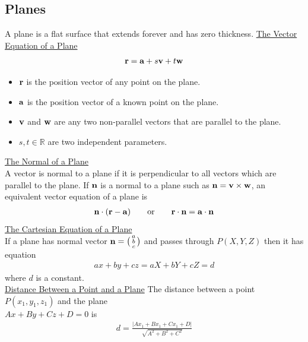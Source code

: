 \documentclass[10pt, a4paper, titlepage]{article}
\begin{document}
\begin{multicols*}{3}
	\dotfill
	\subsection{Planes}
	A plane is a flat surface that extends forever and has zero thickness.
	\underline{The Vector Equation of a Plane}
	\begin{align}
		\vb{r}=\vb{a}+s\vb{v}+t\vb{w}
	\end{align}
	\begin{itemize}
		\item $\vb{r}$ is the position vector of any point on the plane.
		\item $\vb{a}$ is the position vector of a known point on the plane.
		\item $\vb{v}$ and $\vb{w}$ are any two non-parallel vectors that are parallel to the plane.
		\item $s,t\in\mathbb{R}$ are two independent parameters.
	\end{itemize}
	\underline{The Normal of a Plane}\\
	A vector is normal to a plane if it is perpendicular to all vectors which are parallel to the plane. If $\vb{n}$ is a normal to a plane such as $\vb{n}=\vb{v}\times\vb{w}$, an equivalent vector equation of a plane is
	\begin{align}
		\vb{n}\cdot(\vb{r}-\vb{a})\qquad\text{or}\qquad\vb{r}\cdot\vb{n}=\vb{a}\cdot\vb{n}
	\end{align}
	\underline{The Cartesian Equation of a Plane}\\
	If a plane has normal vector $\vb{n}=\big(\begin{smallmatrix}a \\b \\c \end{smallmatrix}\big)$
	and passes through $P(X, Y, Z)$ then it has equation
	\begin{align}
		ax+by+cz=aX+bY+cZ=d
	\end{align}
	where $d$ is a constant.\\

	\underline{Distance Between a Point and a Plane}
	The distance between a point $P(x_1,y_1,z_1)$ and  the plane \\$Ax+By+Cz+D=0$ is
	\begin{align}
		d=\frac{|Ax_1+Bx_1+Cx_1+D|}{\sqrt{A^2+B^2+C^2}}
	\end{align}


\end{multicols*}
\end{document}
